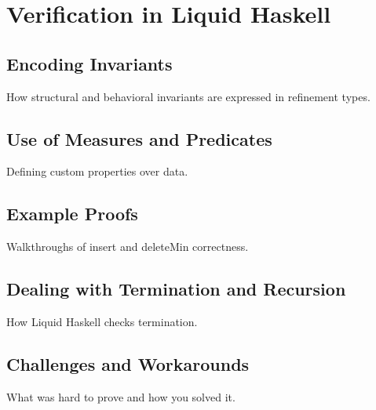 \chapter { Verification in Liquid Haskell }
\label{ch:verification}
\section { Encoding Invariants }
How structural and behavioral invariants are expressed in refinement types.

\section { Use of Measures and Predicates }
Defining custom properties over data.

\section { Example Proofs }
Walkthroughs of insert and deleteMin correctness.

\section { Dealing with Termination and Recursion }
How Liquid Haskell checks termination.

\section { Challenges and Workarounds }
What was hard to prove and how you solved it.
